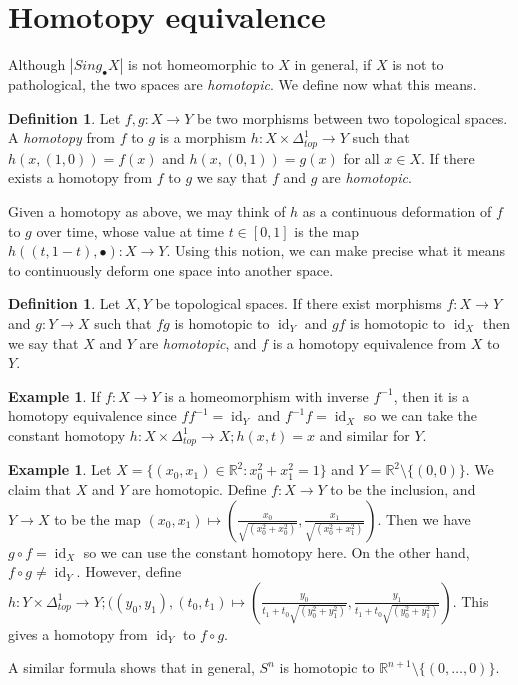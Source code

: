 \documentclass[a4paper]{amsart}
\numberwithin{figure}{section}
\theoremstyle{theorem}
\theoremstyle{definition}
\newtheorem{defi}[thm]{Definition}
\newtheorem{exam}[thm]{Example}
\newcommand{\RR}{\mathbb{R}}
\DeclareMathOperator{\id}{id}
\begin{document}
\section{Homotopy equivalence}

Although $|Sing_\bullet X| $ is not homeomorphic to $X$ in general, if $X$ is not to pathological, the two spaces are \emph{homotopic}. We define now what this means. \\

\begin{mdframed}
\begin{defi}
Let $f, g: X \to Y$ be two morphisms between two topological spaces. A \emph{homotopy} from $f$ to $g$ is a morphism $h: X \times \Delta^1_{top} \to Y$ such that $h(x, (1,0)) = f(x)$ and $h(x, (0,1)) = g(x)$ for all $x \in X$. If there exists a homotopy from $f$ to $g$ we say that $f$ and $g$ are \emph{homotopic}.
\end{defi} 
\end{mdframed}

Given a homotopy as above, we may think of $h$ as a continuous deformation of $f$ to $g$ over time, whose value at time $t \in [0, 1]$ is the map $h((t, 1{-}t), \bullet): X \to Y$. Using this notion, we can make precise what it means to continuously deform one space into another space.  \\

\begin{mdframed}
\begin{defi}
Let $X, Y$ be topological spaces. If there exist morphisms $f:X \to Y$ and $g: Y \to X$ such that $fg$ is homotopic to $\id_Y$ and $gf$ is homotopic to $\id_X$ then we say that $X$ and $Y$ are \emph{homotopic}, and $f$ is a homotopy equivalence from $X$ to $Y$. 
\end{defi}
\end{mdframed}

\begin{exam}
If $f: X \to Y$ is a homeomorphism with inverse $f^{-1}$, then it is a homotopy equivalence since $f f^{-1} = \id_Y$ and $f^{-1} f = \id_X$ so we can take the constant homotopy $h: X \times \Delta^1_{top} \to X; h(x, t) = x$ and similar for $Y$.
\end{exam}

\begin{exam}
Let $X = \{ (x_0, x_1) \in \RR^2 : x_0^2 + x_1^2 = 1\}$ and $Y = \RR^2 \setminus \{(0, 0)\}$. We claim that $X$ and $Y$ are homotopic. Define $f: X \to Y$ to be the inclusion, and $Y \to X$ to be the map $(x_0, x_1) \mapsto (\tfrac{x_0}{\sqrt{(x_0^2 + x_0^2)}}, \tfrac{x_1}{\sqrt{(x_0^2 + x_1^2)}})$. Then we have $g \circ f = \id_X$ so we can use the constant homotopy here. On the other hand, $f \circ g \neq \id_Y$. However, define $h: Y \times \Delta^1_{top} \to Y;  ((y_0, y_1), (t_0, t_1) \mapsto (\tfrac{y_0}{t_1 + t_0\sqrt{(y_0^2 + y_1^2)}}, \tfrac{y_1}{t_1 + t_0\sqrt{(y_0^2 + y_1^2)}})$. This gives a homotopy from $\id_Y$ to $f \circ g$. 

A similar formula shows that in general, $S^n$ is homotopic to $\RR^{n+1} \setminus \{(0, \dots, 0)\}$. 
\end{exam}
\end{document}
